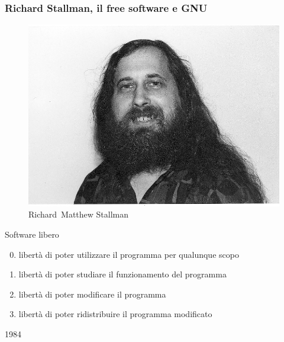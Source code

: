 \documentclass{beamer}
\begin{document}
\begin{frame}
    \frametitle{Richard Stallman, il free software e GNU}

    \begin{minipage}{.4\linewidth}
    \begin{figure}
    \includegraphics[width=.9\linewidth]{img/rms.jpeg}
    \caption{Richard~Matthew Stallman}
    \end{figure}
    \end{minipage}
    \pause
    \begin{minipage}{.55\linewidth}
    \begin{block}{Software libero}
        \begin{enumerate}
        \setcounter{enumi}{-1}
        \item libertà di poter utilizzare il programma per qualunque scopo
        \item libertà di poter studiare il funzionamento del programma
        \item libertà di poter modificare il programma
        \item libertà di poter ridistribuire il programma modificato
        \end{enumerate}
    \end{block}
    \pause
    \begin{block}{1984}
        \begin{minipage}{.2\linewidth}

\end{minipage}
\end{block}
\end{minipage}
\end{frame}
\end{document}
